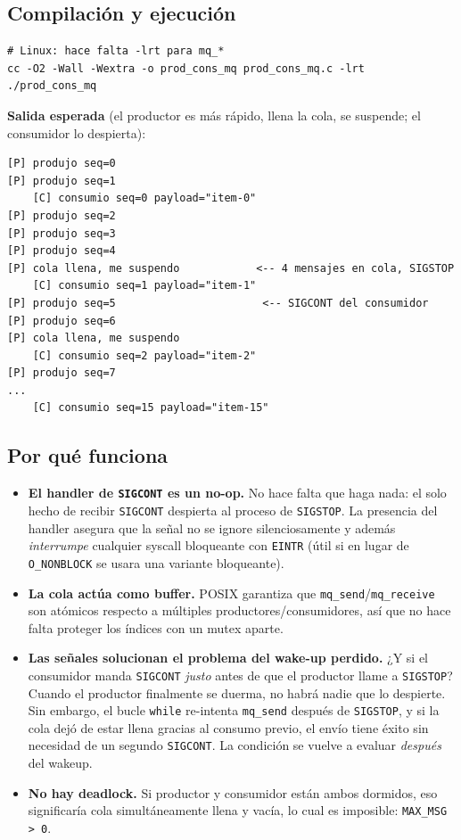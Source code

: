 \documentclass[11pt,a4paper]{article}
\begin{document}
\subsection*{Compilación y ejecución}

\begin{lstlisting}
# Linux: hace falta -lrt para mq_*
cc -O2 -Wall -Wextra -o prod_cons_mq prod_cons_mq.c -lrt
./prod_cons_mq
\end{lstlisting}

\textbf{Salida esperada} (el productor es más rápido, llena la cola,
se suspende; el consumidor lo despierta):

\begin{lstlisting}[style=textstyle]
[P] produjo seq=0
[P] produjo seq=1
    [C] consumio seq=0 payload="item-0"
[P] produjo seq=2
[P] produjo seq=3
[P] produjo seq=4
[P] cola llena, me suspendo            <-- 4 mensajes en cola, SIGSTOP
    [C] consumio seq=1 payload="item-1"
[P] produjo seq=5                       <-- SIGCONT del consumidor
[P] produjo seq=6
[P] cola llena, me suspendo
    [C] consumio seq=2 payload="item-2"
[P] produjo seq=7
...
    [C] consumio seq=15 payload="item-15"
\end{lstlisting}

\subsection*{Por qué funciona}

\begin{itemize}[leftmargin=*]
    \item \textbf{El handler de \texttt{SIGCONT} es un no-op.} No hace
        falta que haga nada: el solo hecho de recibir \texttt{SIGCONT}
        despierta al proceso de \texttt{SIGSTOP}. La presencia del
        handler asegura que la señal no se ignore silenciosamente y
        además \emph{interrumpe} cualquier syscall bloqueante con
        \texttt{EINTR} (útil si en lugar de \texttt{O\_NONBLOCK} se
        usara una variante bloqueante).
    \item \textbf{La cola actúa como buffer.} POSIX garantiza que
        \texttt{mq\_send}/\texttt{mq\_receive} son atómicos respecto a
        múltiples productores/consumidores, así que no hace falta
        proteger los índices con un mutex aparte.
    \item \textbf{Las señales solucionan el problema del wake-up
        perdido.} ¿Y si el consumidor manda \texttt{SIGCONT} \emph{justo}
        antes de que el productor llame a \texttt{SIGSTOP}? Cuando el
        productor finalmente se duerma, no habrá nadie que lo despierte.
        Sin embargo, el bucle \texttt{while} re-intenta \texttt{mq\_send}
        después de \texttt{SIGSTOP}, y si la cola dejó de estar llena
        gracias al consumo previo, el envío tiene éxito sin necesidad
        de un segundo \texttt{SIGCONT}. La condición se vuelve a
        evaluar \emph{después} del wakeup.
    \item \textbf{No hay deadlock.} Si productor y consumidor están
        ambos dormidos, eso significaría cola simultáneamente llena
        y vacía, lo cual es imposible: \texttt{MAX\_MSG > 0}.
\end{itemize}
\end{document}
